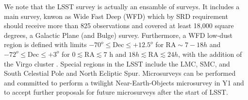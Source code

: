 We note that the LSST survey is actually an ensamble of surveys. It includes a main survey, knwon as Wide Fast Deep (WFD) which by SRD requirement should receive more than 825 observations and covered at least 18,000 square degrees, a Galactic Plane (and Bulge) survey. Furthermore, a WFD low-dust region is defined with limits $-70^o \leq \mathrm{Dec} \leq +12.5^o$ for 
$\mathrm{RA} \sim   7-18 h$ and $-72^o \leq \mathrm{Dec}\leq +3^o$
for $0 \lesssim \mathrm{RA} \lesssim 7$ h and $18 h \lesssim \mathrm{RA} \lesssim 24 h$, with the addition of the Virgo cluster .  Special regions in the LSST include the LMC, SMC, and South Celestial Pole and North Ecliptic Spur. Microsurveys can be performed and  committed to perform a twilight Near-Earth-Objects microsurvey in Y1 and to accept further proposals for future microsurveys after the start of LSST.